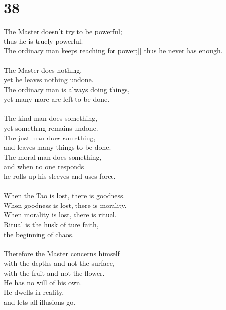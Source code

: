 \documentclass[b5paper, 12pt, oneside]{book}
\begin{document}
\chapter*{38}
The Master doesn't try to be powerful;\\
thus he is truely powerful.\\
The ordinary man keeps reaching for power;]]
thus he never has enough.\\
\\
The Master does nothing,\\
yet he leaves nothing undone.\\
The ordinary man is always doing things,\\
yet many more are left to be done.\\
\\
The kind man does something,\\
yet something remains undone.\\
The just man does something,\\
and leaves many things to be done.\\
The moral man does something,\\
and when no one responds\\
he rolls up his sleeves and uses force.\\
\\
When the Tao is lost, there is goodness.\\
When goodness is lost, there is morality.\\
When morality is lost, there is ritual.\\
Ritual is the husk of ture faith,\\
the beginning of chaos.\\
\\
Therefore the Master concerns himself\\
with the depths and not the surface,\\
with the fruit and not the flower.\\
He has no will of his own.\\
He dwells in reality,\\
and lets all illusions go.\\
\end{document}
